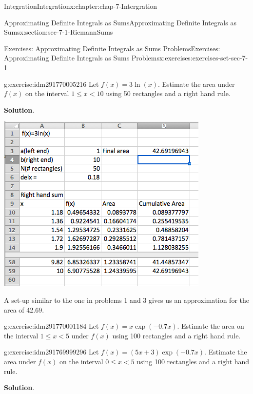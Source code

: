 \documentclass[oneside,10pt,]{book}
\numberwithin{equation}{section}
\newcommand{\lt}{<}
\begin{document}
\begin{chapterptx}{Integration}{}{Integration}{}{}{x:chapter:chap-7-Intergration}
\begin{sectionptx}{Approximating Definite Integrals as Sums}{}{Approximating Definite Integrals as Sums}{}{}{x:section:sec-7-1-RiemannSums}
\begin{exercises-subsection}{Exercises: Approximating Definite Integrals as Sums Problems}{}{Exercises: Approximating Definite Integrals as Sums Problems}{}{}{x:exercises:exercises-set-sec-7-1}
\begin{divisionexercise}{5}{}{}{g:exercise:idm291770005216}%
Let \(f(x) = 3 \ln(x)\).  Estimate the area under \(f(x)\) on the interval \(1 \le  x \lt 10\) using 50 rectangles and a right hand rule.%
\par\smallskip%
\noindent\textbf{Solution}.\hypertarget{g:solution:idm291770003504}{}\quad{}\begin{sidebyside}{1}{0.25}{0.25}{0}%
\begin{sbspanel}{0.5}%
\includegraphics[width=\linewidth]{images/sec7-1-sol5a.png}
\end{sbspanel}%
\end{sidebyside}%
\par
A set-up similar to the one in problems 1 and 3 gives us an approximation for the area of  42.69.%
\end{divisionexercise}%
\begin{divisionexercise}{6}{}{}{g:exercise:idm291770001184}%
Let \(f(x) = x \exp(-0.7 x)\).  Estimate the area on the interval \(1 \le  x \lt 5\) under \(f(x)\) using 100 rectangles and a right hand rule.%
\end{divisionexercise}%
\begin{divisionexercise}{7}{}{}{g:exercise:idm291769999296}%
Let \(f(x) = (5 x + 3) \exp(-0.7 x)\).  Estimate the area under \(f(x)\) on the interval \(0 \le  x \lt 5\) using 100 rectangles and a right hand rule.%
\par\smallskip%
\noindent\textbf{Solution}.\hypertarget{g:solution:idm291769997584}{}\quad{}\begin{sidebyside}{1}{0.2}{0.2}{0}%

\end{sidebyside}
\end{divisionexercise}
\end{exercises-subsection}
\end{sectionptx}
\end{chapterptx}
\end{document}

